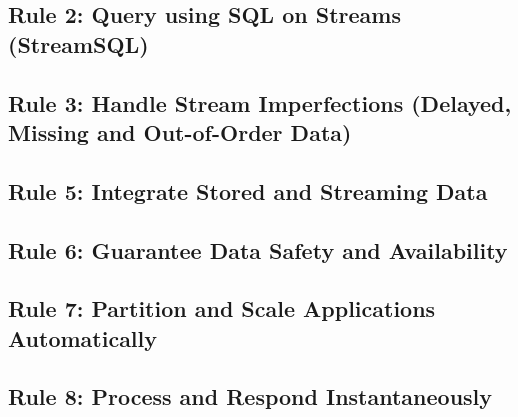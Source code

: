 \subsection{Rule 2: Query using SQL on Streams (StreamSQL)}


\subsection{Rule 3: Handle Stream Imperfections (Delayed, Missing
and Out-of-Order Data)}


\subsection{Rule 5: Integrate Stored and Streaming Data}


\subsection{Rule 6: Guarantee Data Safety and Availability}

\subsection{Rule 7: Partition and Scale Applications Automatically}


\subsection{Rule 8: Process and Respond Instantaneously}